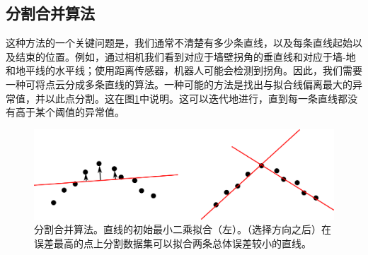 
\subsection{分割合并算法}

这种方法的一个关键问题是，我们通常不清楚有多少条直线，以及每条直线起始以及结束的位置。例如，通过相机我们看到对应于墙壁拐角的垂直线和对应于墙-地和地平线的水平线；使用距离传感器，机器人可能会检测到拐角。因此，我们需要一种可将点云分成多条直线的算法。一种可能的方法是找出与拟合线偏离最大的异常值，并以此点分割。这在图\ref{fig:splitandmerge}中说明。这可以迭代地进行，直到每一条直线都没有高于某个阈值的异常值。


\begin{figure}
\includegraphics[width=\textwidth]{figs/splitandmerge}
\caption{
分割合并算法。直线的初始最小二乘拟合（左）。（选择方向之后）在误差最高的点上分割数据集可以拟合两条总体误差较小的直线。
\label{fig:splitandmerge}}
\end{figure}

